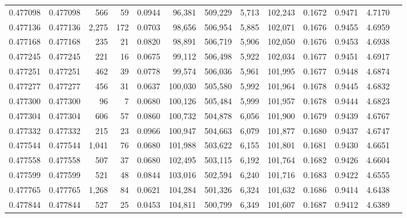 \begin{tabular}{rrrrrrrrrrrrr}
0.477098 & 0.477098 &   566 &    59 &                                     0.0944 &  96,381 & 509,229 &   5,713 & 102,243 & 0.1672 & 0.9471 & 4.7170 \\
0.477136 & 0.477136 & 2,275 &   172 &                                     0.0703 &  98,656 & 506,954 &   5,885 & 102,071 & 0.1676 & 0.9455 & 4.6959 \\
0.477168 & 0.477168 &   235 &    21 &                                     0.0820 &  98,891 & 506,719 &   5,906 & 102,050 & 0.1676 & 0.9453 & 4.6938 \\
0.477245 & 0.477245 &   221 &    16 &                                     0.0675 &  99,112 & 506,498 &   5,922 & 102,034 & 0.1677 & 0.9451 & 4.6917 \\
0.477251 & 0.477251 &   462 &    39 &                                     0.0778 &  99,574 & 506,036 &   5,961 & 101,995 & 0.1677 & 0.9448 & 4.6874 \\
0.477277 & 0.477277 &   456 &    31 &                                     0.0637 & 100,030 & 505,580 &   5,992 & 101,964 & 0.1678 & 0.9445 & 4.6832 \\
0.477300 & 0.477300 &    96 &     7 &                                     0.0680 & 100,126 & 505,484 &   5,999 & 101,957 & 0.1678 & 0.9444 & 4.6823 \\
0.477304 & 0.477304 &   606 &    57 &                                     0.0860 & 100,732 & 504,878 &   6,056 & 101,900 & 0.1679 & 0.9439 & 4.6767 \\
0.477332 & 0.477332 &   215 &    23 &                                     0.0966 & 100,947 & 504,663 &   6,079 & 101,877 & 0.1680 & 0.9437 & 4.6747 \\
0.477544 & 0.477544 & 1,041 &    76 &                                     0.0680 & 101,988 & 503,622 &   6,155 & 101,801 & 0.1681 & 0.9430 & 4.6651 \\
0.477558 & 0.477558 &   507 &    37 &                                     0.0680 & 102,495 & 503,115 &   6,192 & 101,764 & 0.1682 & 0.9426 & 4.6604 \\
0.477599 & 0.477599 &   521 &    48 &                                     0.0844 & 103,016 & 502,594 &   6,240 & 101,716 & 0.1683 & 0.9422 & 4.6555 \\
0.477765 & 0.477765 & 1,268 &    84 &                                     0.0621 & 104,284 & 501,326 &   6,324 & 101,632 & 0.1686 & 0.9414 & 4.6438 \\
0.477844 & 0.477844 &   527 &    25 &                                     0.0453 & 104,811 & 500,799 &   6,349 & 101,607 & 0.1687 & 0.9412 & 4.6389 \\

\end{tabular}
